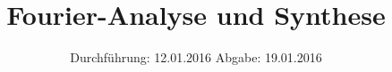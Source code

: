 

\subject{351}
\title{Fourier-Analyse und Synthese}
\date{
  Durchführung: 12.01.2016
  \hspace{3em}
  Abgabe: 19.01.2016
}



\maketitle
\thispagestyle{empty}
\tableofcontents
\newpage






\printbibliography



